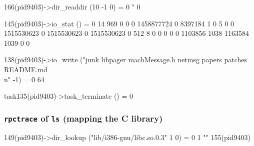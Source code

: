 \documentclass{beamer}
\begin{document}
\begin{frame}[fragile]
\begin{semiverbatim}
  166(pid9403)->dir_readdir (10 -1 0) = 0 " 0

  145(pid9403)->io_stat () = 0 {14 969 0 0 0 1458877724 0 8397184 1 0 5 0 0 1515530623 0 1515530623 0 1515530623 0 512 8 0 0 0 0 0 1103856 1038 1163584 1039 0 0}

  138(pid9403)->io_write ("junk  libpager machMessage.h  netmsg  papers  patches README.md\\n" -1) = 0 64

task135(pid9403)->task_terminate () = 0 
\end{semiverbatim}
\end{frame}

\begin{frame}[fragile]
\frametitle{{\tt rpctrace} of {\tt ls} (mapping the C library)}
\begin{semiverbatim}
\tiny
  149(pid9403)->dir_lookup ("lib/i386-gnu/libc.so.0.3" 1 0) = 0 1 ""    155(pid9403)


\end{semiverbatim}
\end{frame}
\end{document}
